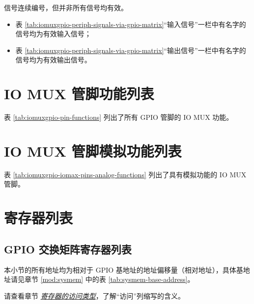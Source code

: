 \documentclass[main\_\_CN.tex]{subfiles}
\begin{document}
\begin{tiplisting}
信号连续编号，但并非所有信号均有效。
\vspace{-1em}
\begin{itemize}
    \item 表 \ref{tab:iomuxgpio-periph-signals-via-gpio-matrix}“输入信号”一栏中有名字的信号均为有效输入信号；
    \item 表 \ref{tab:iomuxgpio-periph-signals-via-gpio-matrix}“输出信号”一栏中有名字的信号均为有效输出信号。
\end{itemize}
\end{tiplisting}

\begin{landscape}



\end{landscape}
\section{IO MUX 管脚功能列表}
\label{sec:iomux_pads}
表 \ref{tab:iomuxgpio-pin-functions} 列出了所有 GPIO 管脚的 IO MUX 功能。



\section{IO MUX 管脚模拟功能列表}
\label{sec:rtcmux_pins}

表 \ref{tab:iomuxgpio-iomax-pins-analog-functions} 列出了具有模拟功能的 IO MUX 管脚。






\hypertarget{iomuxgpio-reg-summ}{}
\section{寄存器列表}

\subsection{GPIO 交换矩阵寄存器列表}
本小节的所有地址均为相对于 GPIO 基地址的地址偏移量（相对地址），具体基地址请见章节 \ref{mod:sysmem} \textit{} 中的表 \ref{tab:sysmem-base-address}。
\label{section:4.12}

请查看章节 \hyperref[glossary-access-types]{\textit{寄存器的访问类型}}，了解“访问”列缩写的含义。
\end{document}
